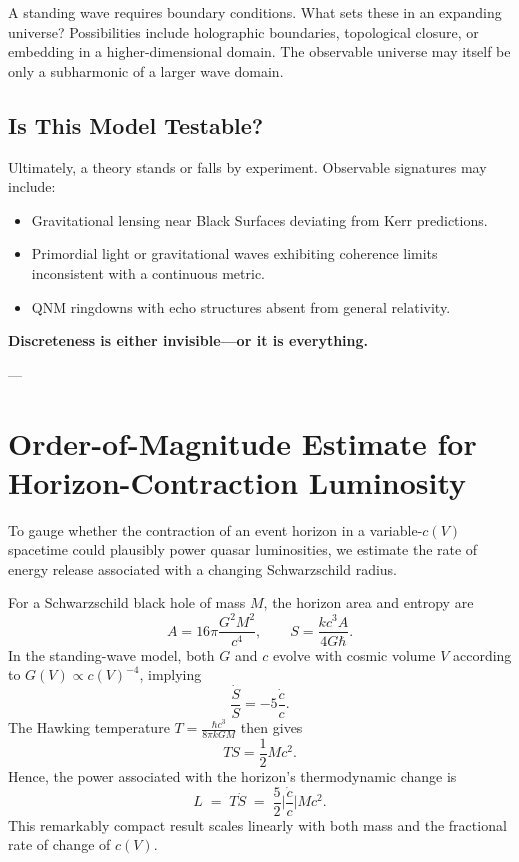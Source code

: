 \documentclass[12pt]{article}
\begin{document}
A standing wave requires boundary conditions. What sets these in an expanding universe? Possibilities include holographic boundaries, topological closure, or embedding in a higher-dimensional domain. The observable universe may itself be only a subharmonic of a larger wave domain.

\subsection{Is This Model Testable?}

Ultimately, a theory stands or falls by experiment. Observable signatures may include:

\begin{itemize}
    \item Gravitational lensing near Black Surfaces deviating from Kerr predictions.
    \item Primordial light or gravitational waves exhibiting coherence limits inconsistent with a continuous metric.
    \item QNM ringdowns with echo structures absent from general relativity.
\end{itemize}

\vspace{2em}

\begin{center}
\textbf{Discreteness is either invisible---or it is everything.}
\end{center}


---

\newpage
\appendix
\section{Order-of-Magnitude Estimate for Horizon-Contraction Luminosity}
\label{app:horizon_contraction}

To gauge whether the contraction of an event horizon in a variable-$c(V)$ spacetime could plausibly power quasar luminosities, we estimate the rate of energy release associated with a changing Schwarzschild radius.

For a Schwarzschild black hole of mass $M$, the horizon area and entropy are
\[
A = 16\pi \frac{G^2 M^2}{c^4}, \qquad
S = \frac{k c^3 A}{4 G \hbar}.
\]
In the standing-wave model, both $G$ and $c$ evolve with cosmic volume $V$ according to $G(V) \propto c(V)^{-4}$, implying
\[
\frac{\dot{S}}{S} = -5 \frac{\dot{c}}{c}.
\]
The Hawking temperature $T = \frac{\hbar c^3}{8\pi k G M}$ then gives
\[
T S = \frac{1}{2} M c^2.
\]
Hence, the power associated with the horizon’s thermodynamic change is
\[
L \;=\; T \dot{S} \;=\; \frac{5}{2} \bigg|\frac{\dot{c}}{c}\bigg| M c^2.
\]
This remarkably compact result scales linearly with both mass and the fractional rate of change of $c(V)$.
\end{document}
